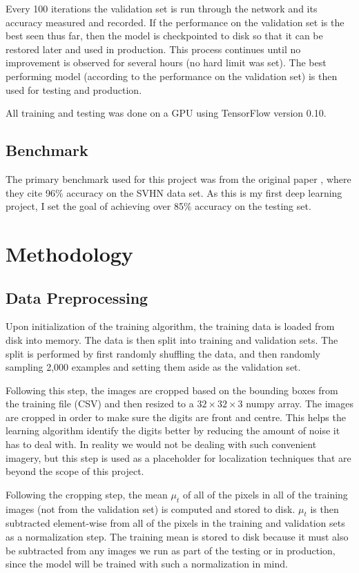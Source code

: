 \documentclass[12pt]{article}
\begin{document}
Every 100 iterations the validation set is run through the network and its accuracy measured and recorded.
If the performance on the validation set is the best seen thus far, then  the model is checkpointed to disk so that it can be restored later and used in production.
This process continues until no improvement is observed for several hours (no hard limit was set).
The best performing model (according to the performance on the validation set) is then used for testing and production.

All training and testing was done on a GPU using TensorFlow version 0.10.


\subsection{Benchmark}
The primary benchmark used for this project was from the original paper \cite{svhn_original_paper}, where they cite 96\% accuracy on the SVHN data set. As this is my first deep learning project, I set the goal of achieving over 85\% accuracy on the testing set.

\section{Methodology}
\subsection{Data Preprocessing}
Upon initialization of the training algorithm, the training data is loaded from disk into memory.
The data is then split into training and validation sets.
The split is performed by first randomly shuffling the data, and then randomly sampling 2,000 examples and setting them aside as the validation set.

Following this step, the images are cropped based on the bounding boxes from the training file (CSV) and then resized to a $32 \times 32 \times 3$ numpy array.
The images are cropped in order to make sure the digits are front and centre.
This helps the learning algorithm identify the digits better by reducing the amount of noise it has to deal with.
In reality we would not be dealing with such convenient imagery, but this step is used as a placeholder for localization techniques that are beyond the scope of this project.

Following the cropping step, the mean $\mu_t$ of all of the pixels in all of the training images (not from the validation set) is computed and stored to disk. 
$\mu_t$ is then subtracted element-wise from all of the pixels in the training and validation sets as a normalization step.
The training mean is stored to disk because it must also be subtracted from any images we run as part of the testing or in production, since the model will be trained with such a normalization in mind.
\end{document}

